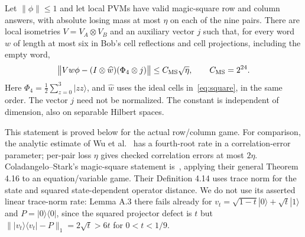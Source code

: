 \begin{theorem}\label{thm:wordextraction}
Let $\|\phi\|\leq1$ and let local PVMs have valid magic-square row and column
answers, with absolute losing mass at most $\eta$ on each of the nine pairs.
There are local isometries $V=V_A\otimes V_B$ and an auxiliary vector $j$
such that, for every word $w$ of length at most six in Bob's cell reflections
and cell projections, including the empty word,
\begin{equation}\label{eq:wordextraction}
\bigl\|Vw\phi-(I\otimes\widehat w)(\Phi_4\otimes j)\bigr\|
\leq C_{\rm MS}\sqrt\eta,\qquad C_{\rm MS}=2^{24}.
\end{equation}
Here $\Phi_4=\frac12\sum_{z=0}^3|zz\rangle$, and $\widehat w$ uses the
ideal cells in~\eqref{eq:square}, in the same order. The vector $j$ need not
be normalized. The constant is independent of dimension, also on separable
Hilbert spaces.
\end{theorem}

This statement is proved below for the actual row/column game. For comparison,
the analytic estimate of Wu et al.~\cite[Appendix C, (124)]{WBMS} has a
fourth-root rate in a correlation-error parameter; per-pair loss $\eta$
gives checked correlation errors at most $2\eta$. Coladangelo--Stark's
magic-square statement is~\cite[Theorem 6.9]{CSrobust}, applying their general
Theorem 4.16 to an equation/variable game. Their Definition 4.14 uses trace
norm for the state and squared state-dependent operator distance. We do not
use its asserted linear trace-norm rate: Lemma A.3 there fails already for
$v_t=\sqrt{1-t}|0\rangle+\sqrt t|1\rangle$ and $P=|0\rangle\langle0|$,
since the squared projector defect is $t$ but
$\||v_t\rangle\langle v_t|-P\|_1=2\sqrt t>6t$ for $0<t<1/9$.

